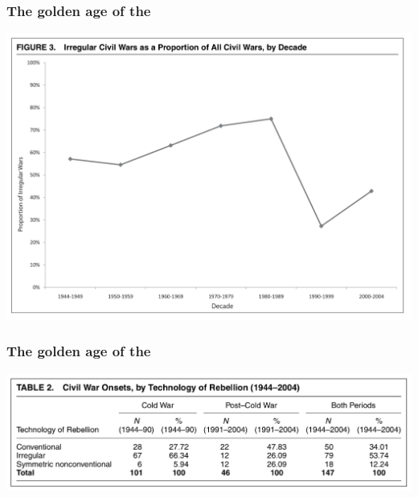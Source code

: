 \documentclass[aspectratio=43]{beamer}
\begin{document}
\begin{frame}
\frametitle{The golden age of the }
\centering

\includegraphics[width = \textwidth]{img/kalyvas_balcells_irr}

\end{frame}

\begin{frame}
\frametitle{The golden age of the }
\centering

\includegraphics[width = \textwidth]{img/kalyvas_balcells_table}

\end{frame}
\end{document}
